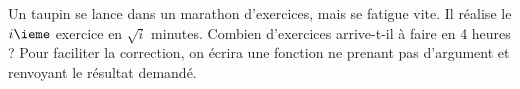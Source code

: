 \question{} Un taupin se lance dans un marathon d'exercices, mais se fatigue vite. Il réalise le $i\ieme$ exercice en $\sqrt{i}$ minutes. Combien d'exercices arrive-t-il à faire en 4 heures ? 
Pour faciliter la correction, on écrira une fonction  ne prenant pas d'argument et renvoyant le résultat demandé.